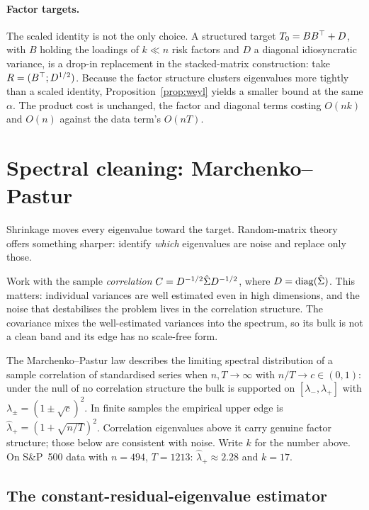 \paragraph{Factor targets.} The scaled identity is not the only choice. A structured
target $T_0 = BB^{\top} + D$, with $B$ holding the loadings of $k \ll n$ risk factors and
$D$ a diagonal idiosyncratic variance, is a drop-in replacement in the stacked-matrix
construction: take $R = (B^{\top}; D^{1/2})$. Because the factor structure clusters
eigenvalues more tightly than a scaled identity, Proposition~\ref{prop:weyl} yields a
smaller bound at the same $\alpha$. The product cost is unchanged, the factor and
diagonal terms costing $O(nk)$ and $O(n)$ against the data term's $O(nT)$.

\section{Spectral cleaning: Marchenko--Pastur}

Shrinkage moves every eigenvalue toward the target. Random-matrix theory offers
something sharper: identify \emph{which} eigenvalues are noise and replace only those.

Work with the sample \emph{correlation} $C = D^{-1/2}\hat{\Sigma} D^{-1/2}$, where
$D = \operatorname{diag}(\hat{\Sigma})$. This matters: individual variances are well estimated even in
high dimensions, and the noise that destabilises the problem lives in the correlation
structure. The covariance mixes the well-estimated variances into the spectrum, so its
bulk is not a clean band and its edge has no scale-free form.

The Marchenko--Pastur law \cite{marchenko1967} describes the limiting spectral
distribution of a sample correlation of standardised series when $n, T \to \infty$
with $n/T \to c \in (0,1)$: under the null of no correlation structure the bulk is
supported on $[\lambda_-,\lambda_+]$ with $\lambda_\pm = (1 \pm \sqrt{c})^2$. In
finite samples the empirical upper edge is $\hat\lambda_+ = (1 + \sqrt{n/T})^2$.
Correlation eigenvalues above it carry genuine factor structure; those below are
consistent with noise. Write $k$ for the number above. On S\&P~500 data with $n = 494$,
$T = 1213$: $\hat\lambda_+ \approx 2.28$ and $k = 17$.

\subsection{The constant-residual-eigenvalue estimator}

